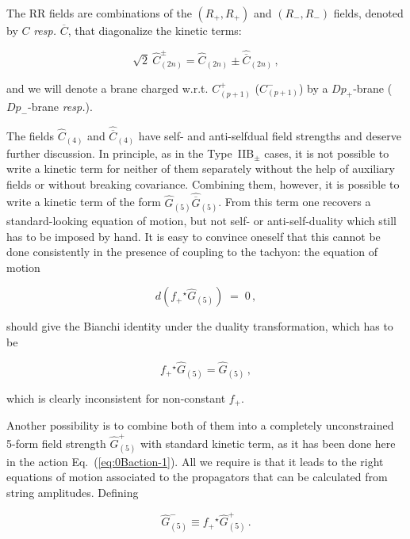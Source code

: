 \documentclass[12pt,a4paper]{article}
\begin{document}
The RR fields are combinations of the $(R_{+},R_{+})$ and $(R_{-},R_{-})$
fields, denoted by $C$ {\em resp.} $\overline{C}$,
that diagonalize the kinetic terms:

\begin{equation}
\sqrt{2}\ \hat{C}_{(2n)}^{\pm} = \hat{C}_{(2n)}\pm 
                                 \hat{\overline{C}}_{(2n)}\, ,
\end{equation}

\noindent and we will denote a brane charged w.r.t. $C^{+}_{(p+1)}$
($C^{-}_{(p+1)}$) by a $Dp_{+}$-brane ($Dp_{-}$-brane {\em resp.}). 

The fields $\hat{C}_{(4)}$ and $\hat{\overline{C}}_{(4)}$ have self- 
and anti-selfdual field strengths and deserve further discussion. In
principle, as in the Type~IIB$_{\pm}$ cases, it is not possible to
write a kinetic term for neither of them separately without the help
of auxiliary fields or without breaking covariance. Combining
them, however, it is possible to write a kinetic term of the form
$\hat{G}_{(5)}\hat{\overline{G}}_{(5)}$. From this term one recovers a
standard-looking equation of motion, but not self- or
anti-self-duality which still has to be imposed by hand. It is easy to
convince oneself that this cannot be done consistently in the presence
of coupling to the tachyon: the equation of motion

\begin{equation}
d\left( f_{+} {}^{\star}\hat{G}_{(5)}\right) \;=\; 0\, ,  
\end{equation}

\noindent should give the Bianchi identity under the duality 
transformation, which has to be

\begin{equation}
f_{+} {}^{\star}\hat{G}_{(5)} = \hat{G}_{(5)}\, ,
\end{equation}

\noindent which is clearly inconsistent for non-constant $f_{+}$.

Another possibility is to combine both of them into a completely
unconstrained 5-form field strength $\hat{G}^{+}_{(5)}$ with standard
kinetic term, as it has been done here in the action
Eq.~(\ref{eq:0Baction-1}). All we require is that it leads to the
right equations of motion associated to the propagators that can be
calculated from string amplitudes. Defining

\begin{equation}
\label{eq:constraint}
 \hat{G}^{-}_{(5)}\equiv f_{+} {}^{\star}\hat{G}^{+}_{(5)}\, .
\end{equation}
\end{document}
